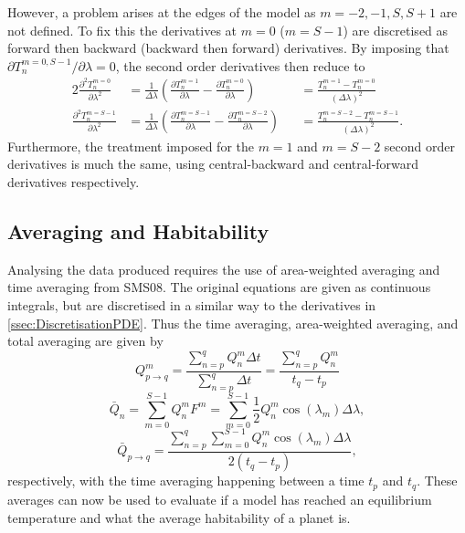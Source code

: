 \documentclass[12pt, onecolumn]{revtex4-2}    %
\newcommand{\partialderiv}[2]{\frac{\partial {#1}}{\partial {#2}}}
\newcommand{\partialderivsecnd}[2]{\frac{\partial^2 {#1}}{\partial {#2}^2}}
\begin{document}
However, a problem arises at the edges of the model as $m=-2, -1, S, S+1$ are not defined.
To fix this the derivatives at $m=0$ ($m=S-1$) are discretised as forward then backward (backward then forward) derivatives.
By imposing that ${\partial T^{m=0, S-1}_n}/{\partial \lambda} = 0$, the second order derivatives then reduce to
\begin{alignat}{2}
  \partialderivsecnd{T^{m=0}_n}{\lambda}   & = \frac{1}{\Delta\lambda  }\left(\partialderiv{T^{m=1}_n}{\lambda} - \partialderiv{T^{m=0}_n}{\lambda}\right)    &  & = \frac{T^{m=1}_n - T^{m=0}_n}{(\Delta\lambda)^2}
  \label{eq:forward_backward}                                                                                                                                                                                     \\
  \partialderivsecnd{T^{m=S-1}_n}{\lambda} & = \frac{1}{\Delta\lambda  }\left(\partialderiv{T^{m=S-1}_n}{\lambda} - \partialderiv{T^{m=S-2}_n}{\lambda}\right) &  & = \frac{T^{m=S-2}_n - T^{m=S-1}_n}{(\Delta\lambda)^2}.
  \label{eq:backward_forward}
\end{alignat}
Furthermore, the treatment imposed for the $m=1$ and $m=S-2$ second order derivatives is much the same, using central-backward and central-forward derivatives respectively.

\subsection{Averaging and Habitability} \label{ssec:habiAver}
Analysing the data produced requires the use of area-weighted averaging and time averaging from SMS08.
The original equations are given as continuous integrals, but are discretised in a similar way to the derivatives in \ref{ssec:DiscretisationPDE}.
Thus the time averaging, area-weighted averaging, and total averaging are given by
\begin{equation}
    Q^m_{p \to q}  = \frac{\sum_{n=p}^{q} Q^m_n \Delta t} {\sum_{n=p}^{q} \Delta t} 
                   = \frac{\sum_{n=p}^{q} Q^m_n}{t_q-t_p}
  \label{eq:Q_timeaverage}
\end{equation}
\begin{equation}
  \bar{Q}_n = \sum_{m=0}^{S-1} Q^m_n F^m = \sum_{m = 0}^{S-1} \frac{1}{2}Q^m_n \cos(\lambda_m) \Delta\lambda,
  \label{eq:Q_areaaveraged}
\end{equation}
\begin{equation}
  \bar{Q}_{p \to q} = \frac{\sum_{n=p}^{q} \sum_{m = 0}^{S-1} Q^m_n \cos(\lambda_m) \Delta\lambda}{2(t_q-t_p)},
  \label{eq:Q_totalaverage}
\end{equation}
respectively, with the time averaging happening between a time $t_p$ and $t_q$.
These averages can now be used to evaluate if a model has reached an equilibrium temperature and what the average habitability of a planet is.
\end{document}
